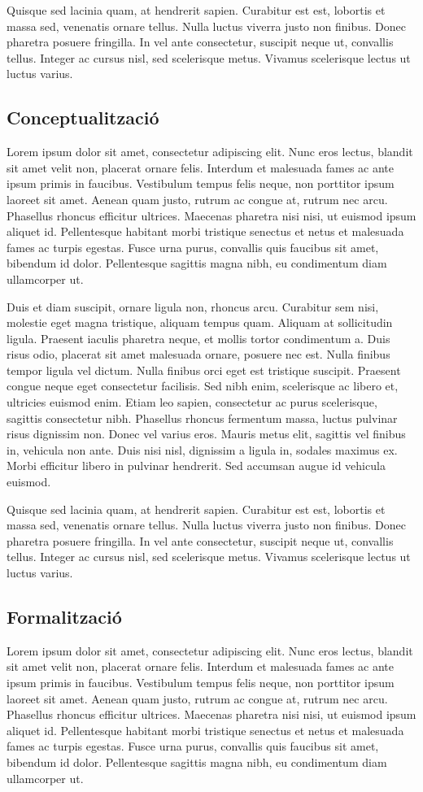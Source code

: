\documentclass[11pt,a4paper]{article}
\begin{document}
Quisque sed lacinia quam, at hendrerit sapien. Curabitur est est, lobortis et massa sed, venenatis ornare tellus. Nulla luctus viverra justo non finibus. Donec pharetra posuere fringilla. In vel ante consectetur, suscipit neque ut, convallis tellus. Integer ac cursus nisl, sed scelerisque metus. Vivamus scelerisque lectus ut luctus varius.
\subsection{Conceptualització}
Lorem ipsum dolor sit amet, consectetur adipiscing elit. Nunc eros lectus, blandit sit amet velit non, placerat ornare felis. Interdum et malesuada fames ac ante ipsum primis in faucibus. Vestibulum tempus felis neque, non porttitor ipsum laoreet sit amet. Aenean quam justo, rutrum ac congue at, rutrum nec arcu. Phasellus rhoncus efficitur ultrices. Maecenas pharetra nisi nisi, ut euismod ipsum aliquet id. Pellentesque habitant morbi tristique senectus et netus et malesuada fames ac turpis egestas. Fusce urna purus, convallis quis faucibus sit amet, bibendum id dolor. Pellentesque sagittis magna nibh, eu condimentum diam ullamcorper ut.

Duis et diam suscipit, ornare ligula non, rhoncus arcu. Curabitur sem nisi, molestie eget magna tristique, aliquam tempus quam. Aliquam at sollicitudin ligula. Praesent iaculis pharetra neque, et mollis tortor condimentum a. Duis risus odio, placerat sit amet malesuada ornare, posuere nec est. Nulla finibus tempor ligula vel dictum. Nulla finibus orci eget est tristique suscipit. Praesent congue neque eget consectetur facilisis. Sed nibh enim, scelerisque ac libero et, ultricies euismod enim. Etiam leo sapien, consectetur ac purus scelerisque, sagittis consectetur nibh. Phasellus rhoncus fermentum massa, luctus pulvinar risus dignissim non. Donec vel varius eros. Mauris metus elit, sagittis vel finibus in, vehicula non ante. Duis nisi nisl, dignissim a ligula in, sodales maximus ex. Morbi efficitur libero in pulvinar hendrerit. Sed accumsan augue id vehicula euismod.

Quisque sed lacinia quam, at hendrerit sapien. Curabitur est est, lobortis et massa sed, venenatis ornare tellus. Nulla luctus viverra justo non finibus. Donec pharetra posuere fringilla. In vel ante consectetur, suscipit neque ut, convallis tellus. Integer ac cursus nisl, sed scelerisque metus. Vivamus scelerisque lectus ut luctus varius.

\subsection{Formalització}
Lorem ipsum dolor sit amet, consectetur adipiscing elit. Nunc eros lectus, blandit sit amet velit non, placerat ornare felis. Interdum et malesuada fames ac ante ipsum primis in faucibus. Vestibulum tempus felis neque, non porttitor ipsum laoreet sit amet. Aenean quam justo, rutrum ac congue at, rutrum nec arcu. Phasellus rhoncus efficitur ultrices. Maecenas pharetra nisi nisi, ut euismod ipsum aliquet id. Pellentesque habitant morbi tristique senectus et netus et malesuada fames ac turpis egestas. Fusce urna purus, convallis quis faucibus sit amet, bibendum id dolor. Pellentesque sagittis magna nibh, eu condimentum diam ullamcorper ut.
\end{document}
